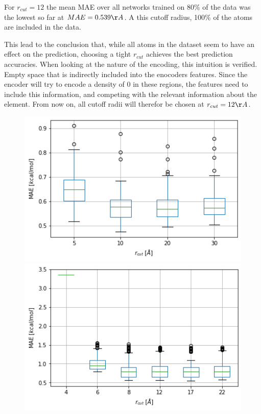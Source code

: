 For $r_{cut}=12$ the mean MAE over all networks trained on 80\% of the data was the lowest so far 
at $MAE = 0.539 \AA$. 
A this cutoff radius, 100\% of the atoms are included in the data.

This lead to the conclusion that, while all atoms in the dataset seem to have an effect on the prediction,
choosing a tight $r_{cut}$ achieves the best prediction accuracies.
When looking at the nature of the encoding, this intuition is verified.
Empty space that is indirectly included into the enocoders features.
Since the encoder will try to encode a density of 0 in these regions, the features 
need to include this information, and competing with the relevant information about the element.
From now on, all cutoff radii will therefor be chosen at $r_{cut} = 12 \AA$.

\begin{figure}[!htb]
    \includegraphics[width=1.0\textwidth]{figures/regression/snap/cut-all.png}
  \endminipage\hfill
    \includegraphics[width=1.0\textwidth]{figures/regression/snap/cut-sphere.png}

\end{figure}
